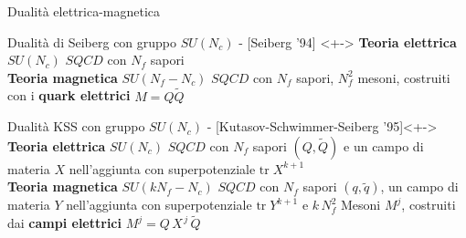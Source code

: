 \documentclass[10pt,compress,usenames,dvipsnames]{beamer}
\begin{document}
\begin{frame}{Dualità elettrica-magnetica}

\begin{block}{Dualità di Seiberg con gruppo $SU(N_c)$ - [Seiberg '94] }<+->
{\bfseries  Teoria elettrica}  \quad $SU(N_c)$  $SQCD$ con $N_f$ sapori \\[0.1cm]
{\bfseries   Teoria magnetica} \quad   $SU(N_f - N_c)$  $SQCD$ con $N_f$ sapori,  $N_f^2$  mesoni,   costruiti con i \alert{\bfseries quark elettrici} $M = Q\tilde{Q}$\\
\end{block}

\vspace{0.5cm}


\begin{block}{Dualità KSS con gruppo $SU(N_c)$ - [Kutasov-Schwimmer-Seiberg '95]}<+->
{\bfseries  Teoria elettrica}  \quad $SU(N_c)$  $SQCD$ con $N_f$ sapori $(Q,\tilde{Q})$ e un campo di materia $X$ nell'aggiunta con superpotenziale $\mathrm{tr} \; X^{k+1}$\\[0.1cm]
{\bfseries  Teoria magnetica}  \quad $SU(k N_f - N_c)$  $SQCD$ con $N_f$ sapori $(q,\tilde{q})$, un campo di materia $Y$ nell'aggiunta con superpotenziale $\mathrm{tr}\; Y^{k+1}$ e  $ k \, N_f^2$  Mesoni $M^j$, costruiti dai \alert{\bfseries campi elettrici} $M^j = Q \, X^{\,j} \, \tilde{Q}$\\
\end{block}
\vfill 
\end{frame}
\end{document}
